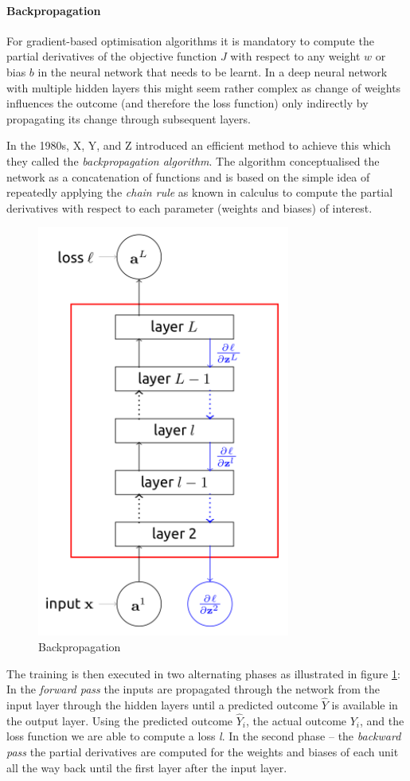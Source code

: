 \paragraph{Backpropagation} For gradient-based optimisation algorithms it is mandatory to compute the partial derivatives of the objective function $J$ with respect to any weight $w$ or bias $b$ in the neural network that needs to be learnt. In a deep neural network with multiple hidden layers this might seem rather complex as change of weights influences the outcome (and therefore the loss function) only indirectly by propagating its change through subsequent layers. 

In the 1980s, X, Y, and Z %
introduced an efficient method to achieve this which they called the \emph{backpropagation algorithm}. The algorithm conceptualised the network as a concatenation of functions and is based on the simple idea of repeatedly applying the \emph{chain rule} as known in calculus to compute the partial derivatives with respect to each parameter (weights and biases) of interest. 


\begin{figure}[h]
	\centering
	\includegraphics[height=0.5\textwidth]{figures/chapter-2/backpropagation.png}
	\caption{Backpropagation}\label{fig:backpropagation}   
\end{figure}


The training is then executed in two alternating phases as illustrated in figure \ref{fig:backpropagation}: In the \emph{forward pass} the inputs are propagated through the network from the input layer through the hidden layers until a predicted outcome $\hat{Y}$ is available in the output layer. Using the predicted outcome $\hat{Y}_i$, the actual outcome $Y_i$, and the loss function we are able to compute a loss \emph{l}.
In the second phase -- the \emph{backward pass} the partial derivatives are computed for the weights and biases of each unit all the way back until the first layer after the input layer. 

